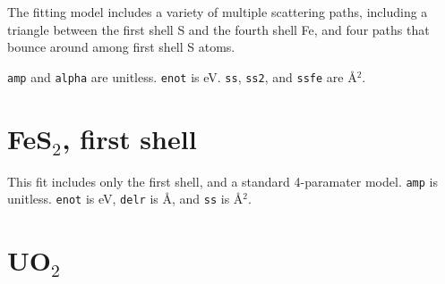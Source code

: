 \documentclass{article}
\let\stdsection\section
\renewcommand\section{\newpage\stdsection}
\begin{document}
The fitting model includes a variety of multiple scattering paths,
including a triangle between the first shell S and the fourth shell
Fe, and four paths that bounce around among first shell S atoms.

\texttt{amp} and \texttt{alpha} are unitless.  \texttt{enot} is eV.
\texttt{ss}, \texttt{ss2}, and \texttt{ssfe} are \AA$^2$.

\renewcommand{\feffMaterial}{FeS2}
\renewcommand{\feffRone}{3}
\renewcommand{\feffRtwo}{3.6}
\renewcommand{\feffRthree}{4}
\renewcommand{\feffRfour}{5.3}
\renewcommand{\feffRfive}{5.5}
\renewcommand{\feffFirst}{}

\small

\scfsevenplots




\section{FeS$_2$, first shell}

\normalsize
This fit includes only the first shell, and a standard 4-paramater
model.  \texttt{amp} is unitless.  \texttt{enot} is eV, \texttt{delr}
is \AA, and \texttt{ss} is \AA$^2$.


\renewcommand{\feffFirst}{_1st}

\small

\scfsevenplots






\section{UO$_2$}
\normalsize
\end{document}
